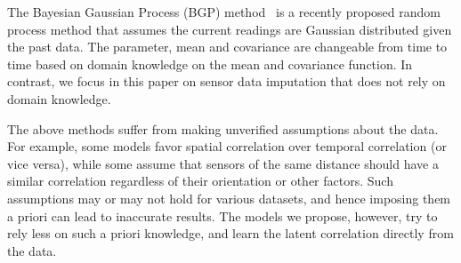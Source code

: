 %

The Bayesian Gaussian Process (BGP) method~\cite{osborne2012real} is a
recently proposed random process method that assumes the current
readings are Gaussian distributed given the past data.  The parameter,
mean and covariance are changeable from time to time based on domain
knowledge on the mean and covariance function.  In contrast, we focus
in this paper on sensor data imputation that does not rely on domain
knowledge.

The above methods suffer from making unverified assumptions about the
data. For example, some models favor spatial correlation over temporal
correlation (or vice versa), while some assume that sensors of the
same distance should have a similar correlation regardless of their
orientation or other factors.  Such assumptions may or may not hold
for various datasets, and hence imposing them a priori can lead to
inaccurate results.  The models we propose, however, try to rely less
on such a priori knowledge, and learn the latent correlation directly
from the data.

